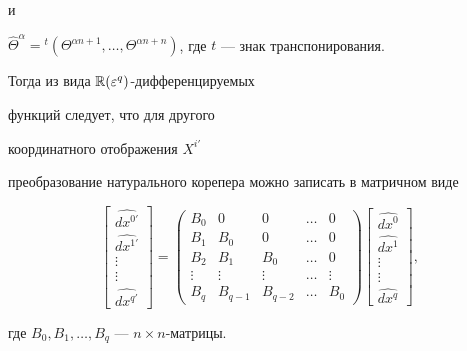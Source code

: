 и


$\widehat\Theta^\alpha = {}^t(\Theta^{\alpha n + 1}, \dotsc,


\Theta^{\alpha n + n})$, где $t$ --- знак транспонирования.


Тогда из вида $\Bbb R(\varepsilon^q)$-дифференцируемых


функций \cite{Vish} следует, что для другого


координатного отображения $X^{i'}$


преобразование натурального корепера можно записать в матричном виде


$$


\begin{bmatrix}


\widehat{dx^{0'}} \\ \widehat{dx^{1'}} \\ \vdots \\ \vdots \\


\widehat{dx^{q'}}


\end{bmatrix}


=


%


\begin{pmatrix}


B_0 &  0  & 0   & \dots & 0 \\


B_1 & B_0 & 0   & \dots & 0 \\


B_2 & B_1 & B_0 & \dots & 0 \\


\vdots & \vdots & \vdots & \dots & \vdots\\


B_q & B_{q-1} & B_{q-2} &\dots & B_0


\end{pmatrix}


%


\begin{bmatrix}


\widehat{dx^0} \\ \widehat{dx^1} \\ \vdots \\ \vdots \\


\widehat{dx^q}


\end{bmatrix},


$$


где $B_0, B_1,\dotsc, B_q$ --- $n\times n$-матрицы.





